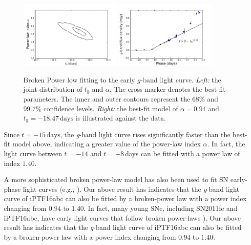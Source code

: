\documentclass[twocolumn]{aastex61}
\begin{document}
\begin{figure}[htb]
  \centering
  \includegraphics[width=0.45\textwidth]{rise_time_power_law_index.pdf}
  \includegraphics[width=0.45\textwidth]{early_lc.pdf}
  \caption{Broken Power low fitting to the early $g$-band light
    curve.
    \textit{Left:} the joint distribution of $t_0$ and
    $\alpha$. The cross marker denotes the best-fit parameters. The
    inner and outer contours represent the $68\%$ and $99.7\%$
    confidence levels.
    \textit{Right:} the best-fit model of $\alpha=0.94$ and
    $t_0=-18.47\,\textrm{days}$ is illustrated against the
    data.
  }
  \label{fig:early_lc_fit}
\end{figure}

Since $t=-15\,\textrm{days}$, the \textit{g}-band light curve rises
significantly faster than the best-fit model above, indicating a
greater value of the power-law index $\alpha$. In fact, the
light curve between $t=-14$ and $t=-8$\,days can be fitted with a
power law of index $1.40$.

A more sophisticated broken power-law model has also been used to fit
SN early-phase light curves (e.g.,
\citealt{2013ApJ...778L..15Z,2014ApJ...783L..24Z,
  2016arXiv161202097Z,2016arXiv161202097Z}). Our above result has
indicates that the \textit{g}-band light curve of iPTF16abc can also
be fitted by a broken-power law with a power index changing from
$0.94$ to $1.40$. In fact, many young SNe, including SN2011fe
\cite{2016arXiv161202097Z} and iPTF16abc, have early light curves that
follow broken power-laws \citep{2016arXiv161202725Z}). Our above
result has indicates that the \textit{g}-band light curve of iPTF16abc
can also be fitted by a broken-power law with a power index changing
from $0.94$ to $1.40$.
\end{document}
